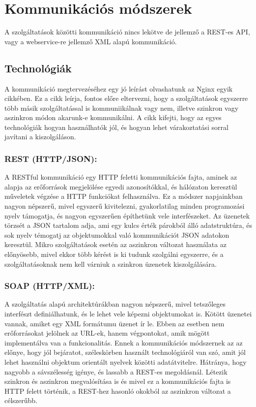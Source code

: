 \documentclass[11pt,magyar,a4paper,oneside,]{report}
\begin{document}
\chapter{Kommunikációs
módszerek}\label{kommunikuxe1ciuxf3s-muxf3dszerek}

A szolgáltatások közötti kommunikáció nincs lekötve de jellemző a
REST-es API, vagy a webservice-re jellemző XML alapú
kommunikáció\citep{rest-soap}.

\section{Technológiák}\label{technoluxf3giuxe1k}

A kommunikáció megtervezéséhez egy jó leírást olvashatunk az Nginx egyik
cikkében\citep{micro-communication}. Ez a cikk leírja, fontos előre
eltervezni, hogy a szolgáltatások egyszerre több másik szolgáltatással
is kommuniikálnak vagy nem, illetve szinkron vagy aszinkron módon
akarunk-e kommunikálni. A cikk kifejti, hogy az egyes technológiák
hogyan használhatók jól, és hogyan lehet várakoztatási sorral javítani a
kiszolgáláson.

\subsection{REST
(HTTP/JSON)\citep{microservices-light}:}\label{rest-httpjsonmicroservices-light}

A RESTful kommunikáció egy HTTP feletti kommunikációs fajta, aminek az
alapja az erőforrások megjelölése egyedi azonosítókkal, és hálózaton
keresztül műveletek végzése a HTTP funkciókat felhasználva. Ez a módszer
napjainkban nagyon népszerű, mivel egyszerű kivitelezni, gyakorlatilag
minden programozási nyelv támogatja, és nagyon egyszerűen építhetünk
vele interfészeket. Az üzenetek törzsét a JSON tartalom adja, ami egy
kulcs érték párokból álló adatstruktúra, és sok nyelv témogatj az
objektumokkal való kommunikációt JSON adatokon keresztül. Mikro
szolgáltatások esetén az aszinkron változat használata az
előnyösebb\citep{rest-async}, mivel ekkor több kérést is ki tudunk
szolgálni egyszerre, és a szolgáltatásoknak nem kell várniuk a szinkron
üzenetek kiszolgálására.

\subsection{SOAP (HTTP/XML)\citep{soap}:}\label{soap-httpxmlsoap}

A szolgáltatás alapú architektúrákban nagyon népszerű, mivel tetszőleges
interfészt definiálhatunk, és le lehet vele képezni objektumokat is.
Kötött üzenetei vannak, amiket egy XML formátumu üzenet ír le. Ebben az
esetben nem erőforrásokat jelölnek az URL-ek, hanem végpontokat, amik
mögött implementálva van a funkcionalitás. Ennek a kommunikációs
módszernek az az előnye, hogy jól bejáratot, széleskörben használt
technológiáról van szó, amit jól lehet használni objektum orientált
nyelvek közötti adatátvitelre. Hátránya, hogy nagyobb a sávszélesség
igénye, és lassabb a REST-es megoldásnál. Létezik szinkron és aszinkron
megvalósítása is és mivel ez a kommunikációs fajta is HTTP felett
történik, a REST-hez hasonló okokból az aszinkron változat a célszerűbb.
\end{document}
